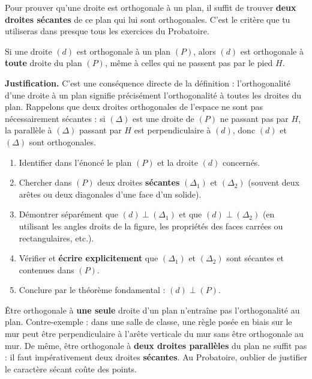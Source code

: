 \documentclass[11pt]{article}
\begin{document}
\begin{aretenir}
Pour prouver qu'une droite est orthogonale à un plan, il suffit de trouver \textbf{deux droites sécantes} de ce plan qui lui sont orthogonales. C'est le critère que tu utiliseras dans presque tous les exercices du Probatoire.
\end{aretenir}

\begin{propriete}
Si une droite $(d)$ est orthogonale à un plan $(P)$, alors $(d)$ est orthogonale à \textbf{toute} droite du plan $(P)$, même à celles qui ne passent pas par le pied $H$.
\end{propriete}

\textbf{Justification.} C'est une conséquence directe de la définition : l'orthogonalité d'une droite à un plan signifie précisément l'orthogonalité à toutes les droites du plan. Rappelons que deux droites orthogonales de l'espace ne sont pas nécessairement sécantes : si $(\Delta)$ est une droite de $(P)$ ne passant pas par $H$, la parallèle à $(\Delta)$ passant par $H$ est perpendiculaire à $(d)$, donc $(d)$ et $(\Delta)$ sont orthogonales.

\begin{methode}
\begin{enumerate}
  \item Identifier dans l'énoncé le plan $(P)$ et la droite $(d)$ concernés.
  \item Chercher dans $(P)$ deux droites \textbf{sécantes} $(\Delta_1)$ et $(\Delta_2)$ (souvent deux arêtes ou deux diagonales d'une face d'un solide).
  \item Démontrer séparément que $(d) \perp (\Delta_1)$ et que $(d) \perp (\Delta_2)$ (en utilisant les angles droits de la figure, les propriétés des faces carrées ou rectangulaires, etc.).
  \item Vérifier et \textbf{écrire explicitement} que $(\Delta_1)$ et $(\Delta_2)$ sont sécantes et contenues dans $(P)$.
  \item Conclure par le théorème fondamental : $(d) \perp (P)$.
\end{enumerate}
\end{methode}

\begin{attention}
Être orthogonale à \textbf{une seule} droite d'un plan n'entraîne pas l'orthogonalité au plan. Contre-exemple : dans une salle de classe, une règle posée en biais sur le mur peut être perpendiculaire à l'arête verticale du mur sans être orthogonale au mur. De même, être orthogonale à \textbf{deux droites parallèles} du plan ne suffit pas : il faut impérativement deux droites \textbf{sécantes}. Au Probatoire, oublier de justifier le caractère sécant coûte des points.
\end{attention}
\end{document}
